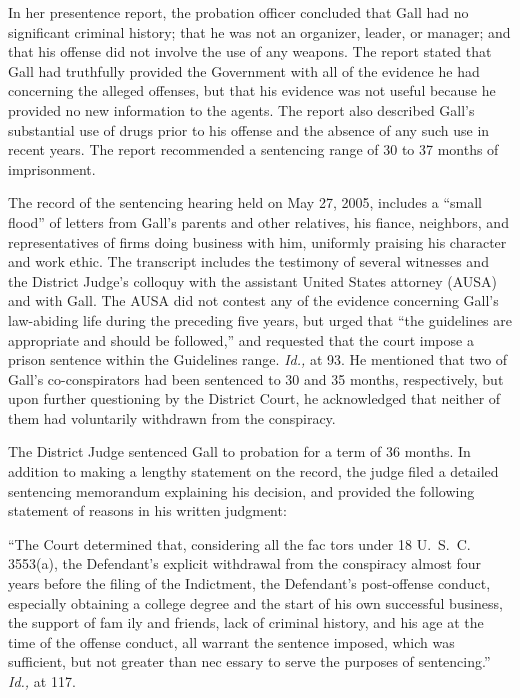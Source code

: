   In her presentence report, the probation officer concluded that Gall
had no significant criminal history; that he was not an organizer,
leader, or manager; and that his offense did not involve the use of
any weapons. The report stated that Gall had truthfully provided the
Government with all of the evidence he had concerning the alleged
offenses, but that his evidence was not useful because he provided
no new information to the agents. The report also described Gall's
substantial use of drugs prior to his offense and the absence of any
such use in recent years. The report recommended a sentencing range of
30 to 37 months of imprisonment.

  The record of the sentencing hearing held on May 27, 2005, includes a
``small flood'' of letters from Gall's parents and other relatives,
his fiance, neighbors, and representatives of firms doing business with
him, uniformly praising his character and work ethic. The transcript
includes the testimony of several witnesses and the District Judge's
colloquy with the assistant United States attorney (AUSA) and with
Gall. The AUSA did not contest any of the evidence concerning Gall's
law-abiding life during the preceding five years, but urged that ``the
guidelines are appropriate and should be followed,'' and requested
that the court impose a prison sentence within the Guidelines range.
\emph{Id.,} at 93. He mentioned that two of Gall's co-conspirators
had been sentenced to 30 and 35 months, respectively, but upon further
questioning by the District Court, he acknowledged that neither of them
had voluntarily withdrawn from the conspiracy.

  The District Judge sentenced Gall to probation for a term of 36
months. In addition to making a lengthy statement on the record, the
judge filed a detailed sentencing memorandum explaining his decision,
and provided the following statement of reasons in his written judgment:

      ``The Court determined that, considering all the fac tors under
18 U.~S.~C. 3553(a), the Defendant's explicit \newpage  withdrawal from
the conspiracy almost four years before the filing of the Indictment,
the Defendant's post-offense conduct, especially obtaining a college
degree and the start of his own successful business, the support of
fam ily and friends, lack of criminal history, and his age at the time
of the offense conduct, all warrant the sentence imposed, which was
sufficient, but not greater than nec essary to serve the purposes of
sentencing.'' \emph{Id.,} at 117.

